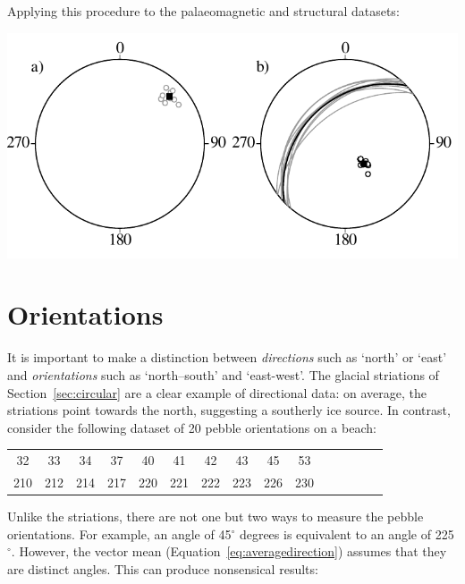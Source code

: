 Applying this procedure to the palaeomagnetic and structural datasets:

\noindent\begin{minipage}[t][][b]{.6\textwidth}
\includegraphics[]{../figures/sphericalmean.pdf}
\end{minipage}
\begin{minipage}[t][][t]{.4\textwidth}
  \label{fig:sphericalmean}
\end{minipage}

\section{Orientations}\label{sec:orientations}

It is important to make a distinction between \emph{directions} such
as `north' or `east' and \emph{orientations} such as `north--south'
and `east-west'. The glacial striations of Section~\ref{sec:circular}
are a clear example of directional data: on average, the striations
point towards the north, suggesting a southerly ice source.  In
contrast, consider the following dataset of 20 pebble orientations on
a beach:

\begin{center}
\begin{tabular}{ccccccccccccccc}
  32 & 33 & 34 & 37 & 40 & 41 & 42 & 43 & 45 & 53 \\
  210 & 212 & 214 & 217 & 220 & 221 & 222 & 223 & 226 & 230
\end{tabular}
\end{center}

Unlike the striations, there are not one but two ways to measure the
pebble orientations. For example, an angle of 45$^\circ$ degrees is
equivalent to an angle of 225$^\circ$. However, the vector mean
(Equation~\ref{eq:averagedirection}) assumes that they are distinct
angles. This can produce nonsensical results:

